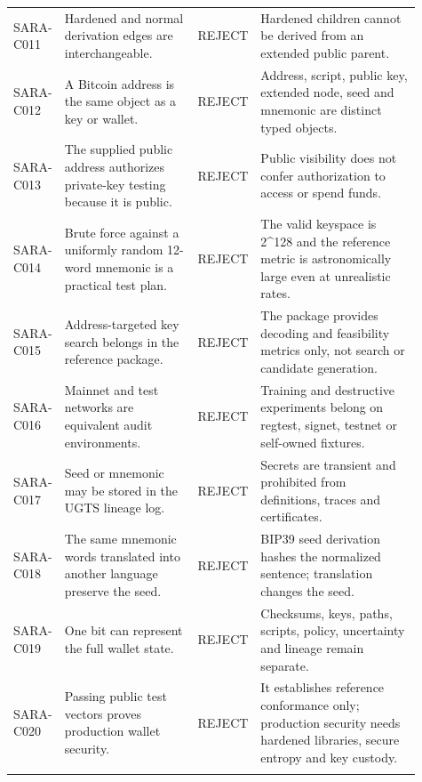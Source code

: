 \begin{longtable}{@{}p{0.09\linewidth} p{0.33\linewidth} p{0.09\linewidth} p{0.40\linewidth}@{}}
\addlinespace[1.5pt]
SARA-C011 & Hardened and normal derivation edges are interchangeable. & REJECT & Hardened children cannot be derived from an extended public parent.\\
\addlinespace[1.5pt]
SARA-C012 & A Bitcoin address is the same object as a key or wallet. & REJECT & Address, script, public key, extended node, seed and mnemonic are distinct typed objects.\\
\addlinespace[1.5pt]
SARA-C013 & The supplied public address authorizes private-key testing because it is public. & REJECT & Public visibility does not confer authorization to access or spend funds.\\
\addlinespace[1.5pt]
SARA-C014 & Brute force against a uniformly random 12-word mnemonic is a practical test plan. & REJECT & The valid keyspace is 2\textasciicircum{}128 and the reference metric is astronomically large even at unrealistic rates.\\
\addlinespace[1.5pt]
SARA-C015 & Address-targeted key search belongs in the reference package. & REJECT & The package provides decoding and feasibility metrics only, not search or candidate generation.\\
\addlinespace[1.5pt]
SARA-C016 & Mainnet and test networks are equivalent audit environments. & REJECT & Training and destructive experiments belong on regtest, signet, testnet or self-owned fixtures.\\
\addlinespace[1.5pt]
SARA-C017 & Seed or mnemonic may be stored in the UGTS lineage log. & REJECT & Secrets are transient and prohibited from definitions, traces and certificates.\\
\addlinespace[1.5pt]
SARA-C018 & The same mnemonic words translated into another language preserve the seed. & REJECT & BIP39 seed derivation hashes the normalized sentence; translation changes the seed.\\
\addlinespace[1.5pt]
SARA-C019 & One bit can represent the full wallet state. & REJECT & Checksums, keys, paths, scripts, policy, uncertainty and lineage remain separate.\\
\addlinespace[1.5pt]
SARA-C020 & Passing public test vectors proves production wallet security. & REJECT & It establishes reference conformance only; production security needs hardened libraries, secure entropy and key custody.\\
\addlinespace[1.5pt]
\bottomrule
\end{longtable}
